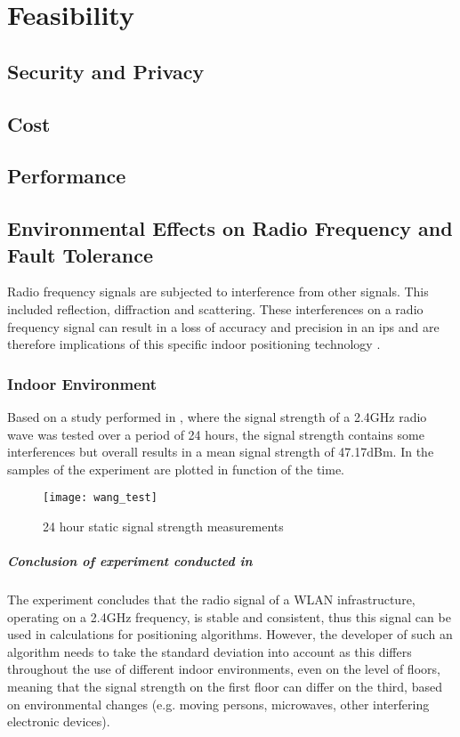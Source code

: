\section{Feasibility}
\subsection{Security and Privacy}
\subsection{Cost}
\subsection{Performance}
\subsection{Environmental Effects on Radio Frequency and Fault Tolerance}
Radio frequency signals are subjected to interference from other signals. This included reflection, diffraction and scattering. These interferences on a radio frequency signal can result in a loss of accuracy and precision in an \acrlong{ips} and are therefore implications of this specific indoor positioning technology \cite{S2016}. 
\subsubsection{Indoor Environment}
Based on a study performed in \cite{Wang2003}, where the signal strength of a 2.4GHz radio wave was tested over a period of 24 hours, the signal strength contains some interferences but overall results in a mean signal strength of 47.17dBm. In \cite{fig:wang_test} the samples of the experiment are plotted in function of the time.
\begin{figure}[h!]
\centering
\texttt{[image: wang\_test]}
\caption{24 hour static signal strength measurements ~\cite{Wang2003}}
\label{fig:wang_test}
\end{figure}
\subparagraph{Conclusion of experiment conducted in ~\cite{Wang2003}}
The experiment concludes that the radio signal of a WLAN infrastructure, operating on a 2.4GHz frequency, is stable and consistent, thus this signal can be used in calculations for positioning algorithms. However, the developer of such an algorithm needs to take the standard deviation into account as this differs throughout the use of different indoor environments, even on the level of floors, meaning that the signal strength on the first floor can differ on the third, based on environmental changes (e.g. moving persons, microwaves, other interfering electronic devices).
